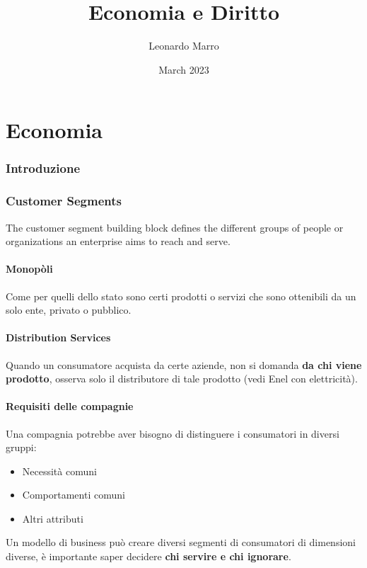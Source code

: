 \documentclass[twocolumn]{article}
\title{Economia e Diritto}
\author{Leonardo Marro}
\date{March 2023}
\begin{document}
 \tableofcontents
\clearpage
\part{Economia}


\section{Introduzione}

\section{Customer Segments}

The customer segment building block defines the different groups of people or organizations an enterprise aims to reach and serve. 
\subsection{Monopòli}
Come per quelli dello stato sono certi prodotti o servizi che sono ottenibili da un solo ente, privato o pubblico.
\subsection{Distribution Services}
Quando un consumatore acquista da certe aziende, non si domanda \textbf{da chi viene prodotto}, osserva solo il distributore di tale prodotto (vedi Enel con elettricità).
\subsection{Requisiti delle compagnie}
Una compagnia potrebbe aver bisogno di distinguere i consumatori in diversi gruppi: \begin{itemize}
    \item Necessità comuni
    \item Comportamenti comuni
    \item Altri attributi
\end{itemize}
Un modello di business può creare diversi segmenti di consumatori di dimensioni diverse, è importante saper decidere \textbf{chi servire e chi ignorare}.
\end{document}
